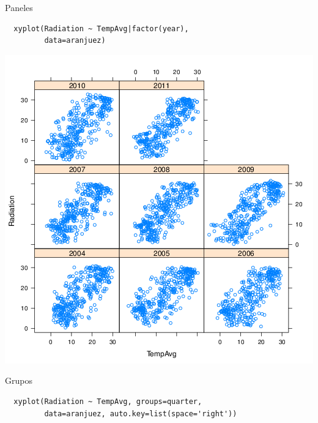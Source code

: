 \documentclass[xcolor={usenames,svgnames,dvipsnames}]{beamer}
\begin{document}
\begin{frame}[fragile,label={sec:orgheadline17}]{Paneles}
 \lstset{language=R,label= ,caption= ,captionpos=b,numbers=none}
\begin{lstlisting}
  xyplot(Radiation ~ TempAvg|factor(year),
         data=aranjuez)
\end{lstlisting}
\end{frame}

\begin{frame}[label={sec:orgheadline18}]{}
\includegraphics[width=.9\linewidth]{figs/xyplotYear.png}
\end{frame}

\begin{frame}[fragile,label={sec:orgheadline19}]{Grupos}
 \lstset{language=R,label= ,caption= ,captionpos=b,numbers=none}
\begin{lstlisting}
  xyplot(Radiation ~ TempAvg, groups=quarter,
         data=aranjuez, auto.key=list(space='right'))
\end{lstlisting}
\end{frame}
\end{document}

